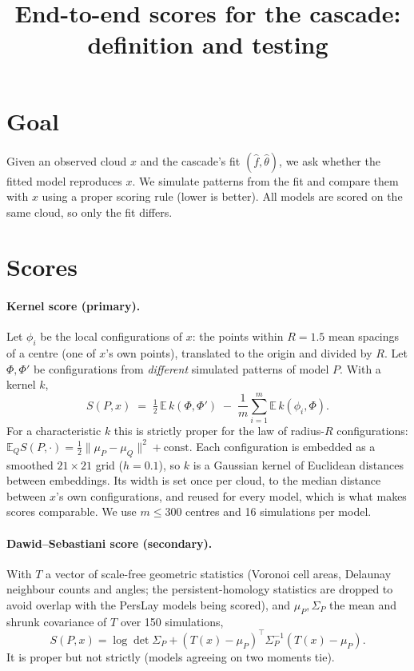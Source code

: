 \documentclass[11pt]{article}
\title{End-to-end scores for the cascade: definition and testing}
\date{}
\begin{document}
\maketitle

\section*{Goal}
Given an observed cloud $x$ and the cascade's fit $(\hat f,\hat\theta)$, we ask whether the fitted model
reproduces $x$. We simulate patterns from the fit and compare them with $x$ using a proper scoring rule
(lower is better). All models are scored on the same cloud, so only the fit differs.

\section*{Scores}
\paragraph{Kernel score (primary).}
Let $\phi_i$ be the local configurations of $x$: the points within $R=1.5$ mean spacings of a centre (one of
$x$'s own points), translated to the origin and divided by $R$. Let $\Phi,\Phi'$ be configurations from
\emph{different} simulated patterns of model $P$. With a kernel $k$,
\[
  S(P,x) \;=\; \tfrac12\,\mathbb{E}\,k(\Phi,\Phi') \;-\; \frac1m\sum_{i=1}^{m}\mathbb{E}\,k(\phi_i,\Phi).
\]
For a characteristic $k$ this is strictly proper for the law of radius-$R$ configurations:
$\mathbb{E}_Q S(P,\cdot)=\tfrac12\|\mu_P-\mu_Q\|^2+\text{const}$. Each configuration is embedded as a
smoothed $21\times21$ grid ($h=0.1$), so $k$ is a Gaussian kernel of Euclidean distances between embeddings.
Its width is set once per cloud, to the median distance between $x$'s own configurations, and reused for
every model, which is what makes scores comparable. We use $m\le300$ centres and 16 simulations per model.

\paragraph{Dawid--Sebastiani score (secondary).}
With $T$ a vector of scale-free geometric statistics (Voronoi cell areas, Delaunay neighbour counts and angles;
the persistent-homology statistics are dropped to avoid overlap with the PersLay models being scored), and
$\mu_P,\Sigma_P$ the mean and shrunk covariance of $T$ over 150 simulations,
\[
  S(P,x)=\log\det\Sigma_P+(T(x)-\mu_P)^\top\Sigma_P^{-1}(T(x)-\mu_P).
\]
It is proper but not strictly (models agreeing on two moments tie).
\end{document}
